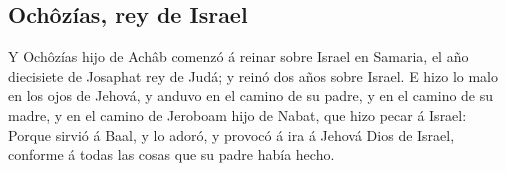 \hypertarget{ochuxf4zuxedas-rey-de-israel}{%
\subsection{Ochôzías, rey de
Israel}\label{ochuxf4zuxedas-rey-de-israel}}

 Y Ochôzías hijo de Achâb comenzó á reinar sobre Israel
en Samaria, el año diecisiete de Josaphat rey de Judá; y reinó dos años
sobre Israel.  E hizo lo malo en los ojos de Jehová, y
anduvo en el camino de su padre, y en el camino de su madre, y en el
camino de Jeroboam hijo de Nabat, que hizo pecar á Israel: Porque sirvió
á Baal, y lo adoró, y provocó á ira á Jehová Dios de Israel, conforme á
todas las cosas que su padre había hecho.
